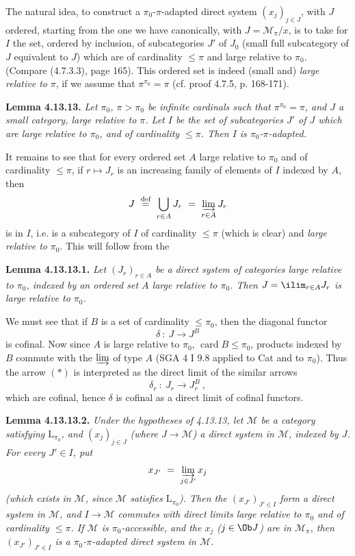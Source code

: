 The natural idea, to construct a $\pi_0$-$\pi$-adapted direct system $(x_j)_{j\in J}$, with $J$ ordered, starting from the one we have canonically, with $J = \mathcal{M}_\pi/x$, is to take for $I$ the set, ordered by inclusion, of subcategories $J'$ of $J_0$ (small full subcategory of $J$ equivalent to $J$) which are of cardinality $\leqslant \pi$ and large relative to $\pi_0$. (Compare (4.7.3.3), page 165). This ordered set is indeed (small and) \textit{large relative to} $\pi$, if we assume that $\pi^{\pi_0} = \pi$ (cf. proof 4.7.5, p. 168-171).

\noindent\textbf{Lemma 4.13.13.} \textit{Let $\pi_0$, $\pi > \pi_0$ be infinite cardinals such that $\pi^{\pi_0} = \pi$, and $J$ a small category, large relative to $\pi$. Let $I$ be the set of subcategories $J'$ of $J$ which are large relative to $\pi_0$, and of cardinality $\leqslant \pi$. Then $I$ is $\pi_0$-$\pi$-adapted.}

It remains to see that for every ordered set $A$ large relative to $\pi_0$ and of cardinality $\leqslant \pi$, if $r \longmapsto J_r$ is an increasing family of elements of $I$ indexed by $A$, then
\[
J \ \overset{\text{def}}{=} \ \bigcup_{r\in A} J_r \ = \ \varinjlim_{r\in A} J_r
\]
is in $I$, i.e. is a subcategory of $I$ of cardinality $\leqslant \pi$ (which is clear) and \textit{large relative to} $\pi_0$. This will follow from the


\noindent\textbf{Lemma 4.13.13.1.} \textit{Let $(J_r)_{r\in A}$ be a direct system of categories large relative to $\pi_0$, indexed by an ordered set $A$ large relative to $\pi_0$. Then $J = \ilim_{r\in A} J_r$ is large relative to $\pi_0$.}

\noindent We must see that if $B$ is a set of cardinality $\leqslant \pi_0$, then the diagonal functor
\[
\delta \ : \ J \longrightarrow J^B \tag*{$(*)$}
\]
is cofinal. Now since $A$ is large relative to $\pi_0$, $\operatorname{card} B \leqslant \pi_0$, products indexed by $B$ commute with the $\varinjlim$ of type $A$ (SGA 4 I 9.8 applied to Cat and to $\pi_0$). Thus the arrow $(*)$ is interpreted as the direct limit of the similar arrows
\[
\delta_r \ : \ J_r \longrightarrow J_r^B \ , \tag*{$(**)$}
\]
which are cofinal, hence $\delta$ is cofinal as a direct limit of cofinal functors.

\noindent\textbf{Lemma 4.13.13.2.} \textit{Under the hypotheses of 4.13.13, let $\mathcal{M}$ be a category satisfying $\mathrm{L}_{\pi_0}$, and $(x_j)_{j\in J}$ (where $J \longrightarrow \mathcal{M}$) a direct system in $\mathcal{M}$, indexed by $J$. For every $J' \in I$, put}
\[
x_{J'} \ = \ \varinjlim_{j\in J'} x_j
\]
\textit{(which exists in $\mathcal{M}$, since $\mathcal{M}$ satisfies $\mathrm{L}_{\pi_0}$). Then the $(x_{J'})_{J'\in I}$ form a direct system in $\mathcal{M}$, and $I \longrightarrow \mathcal{M}$ commutes with direct limits large relative to $\pi_0$ and of cardinality $\leqslant \pi$. If $\mathcal{M}$ is $\pi_0$-accessible, and the $x_j$ ($j \in \Ob J$) are in $\mathcal{M}_\pi$, then $(x_{J'})_{J'\in I}$ is a $\pi_0$-$\pi$-adapted direct system in $\mathcal{M}$.}

